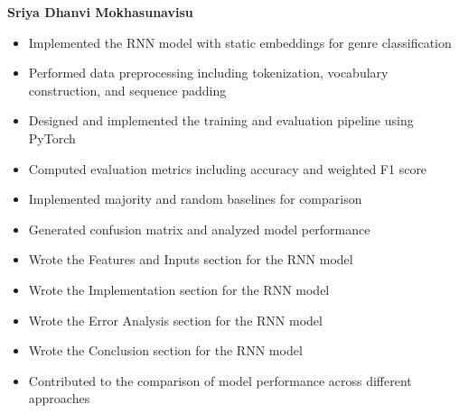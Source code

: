 
\textbf{Sriya Dhanvi Mokhasunavisu}
\begin{itemize}
    \item Implemented the RNN model with static embeddings for genre classification
    \item Performed data preprocessing including tokenization, vocabulary construction, and sequence padding
    \item Designed and implemented the training and evaluation pipeline using PyTorch
    \item Computed evaluation metrics including accuracy and weighted F1 score
    \item Implemented majority and random baselines for comparison
    \item Generated confusion matrix and analyzed model performance
    \item Wrote the Features and Inputs section for the RNN model
    \item Wrote the Implementation section for the RNN model
    \item Wrote the Error Analysis section for the RNN model
    \item Wrote the Conclusion section for the RNN model
    \item Contributed to the comparison of model performance across different approaches
\end{itemize}